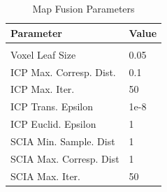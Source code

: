 \documentclass[letterpaper, oneside, 10pt]{report}
\begin{document}
\begin{table}[h!]
  \centering
  \caption{Map Fusion Parameters}
  \vspace{2mm}
  \begin{tabular}{l l}
    \hline \hline
    \vspace{-2mm}
    Parameter & \multicolumn{1}{l}{Value} \\ [1ex]
    \hline
    & \\
    Voxel Leaf Size & 0.05 \\
    ICP Max. Corresp. Dist. & 0.1 \\
    ICP Max. Iter. & 50 \\
    ICP Trans. Epsilon & 1e-8 \\
    ICP Euclid. Epsilon & 1 \\
    SCIA Min. Sample. Dist & 1 \\
    SCIA Max. Corresp. Dist & 1 \\
    SCIA Max. Iter. & 50 \\
  \end{tabular}
\end{table}

\clearpage



\end{document}

